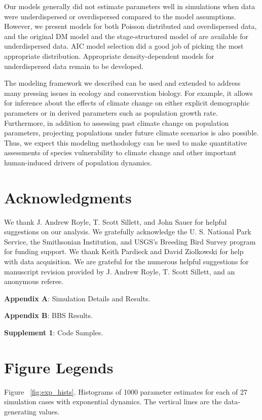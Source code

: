 \documentclass[12pt,english]{article}
\begin{document}
\begin{spacing}{1.9}
\begin{flushleft}
Our models generally did not estimate parameters well in simulations when data were underdispersed
or overdispersed compared to the model assumptions.  However, we present models for
both Poisson distributed and overdispersed data, and the original DM model and the 
stage-structured model of \citet{zipkin_etal:2014} are available for underdispersed data.  AIC model
selection did a good job of picking the most appropriate distribution.  Appropriate 
density-dependent models for underdispersed data remain to be developed.

The modeling framework we described can be used and extended to address many
pressing issues in ecology and conservation biology. For
example,
it allows for inference 
about the effects of climate change on either explicit
demographic parameters or in derived parameters such as
population growth rate. Furthermore, 
in addition to assessing past climate change on population
parameters, projecting populations under future climate scenarios is also
possible. Thus, we expect this modeling methodology can be used
to make quantitative assessments of species vulnerability to climate
change and other important human-induced drivers of population
dynamics.


\section*{Acknowledgments}

We thank J. Andrew Royle, T. Scott Sillett, and John Sauer for helpful suggestions on our analysis. 
We gratefully acknowledge the U. S. National Park 
Service, the Smithsonian Institution, and USGS's Breeding Bird Survey program for funding support.
We thank Keith Pardieck and David Ziolkowski for help with data acquisition. We are
grateful for the numerous helpful suggestions for manuscript
revision provided by J. Andrew Royle, T. Scott Sillett, and an anonymous
referee.



\begin{center}
\noindent{}\textbf{Appendix A}: Simulation Details and Results.

\noindent{}\textbf{Appendix B}: BBS Results.

\noindent{}\textbf{Supplement 1}: Code Samples.
\end{center}

\newpage


\clearpage

\section*{Figure Legends}
\noindent Figure ~\ref{fig:exp_hists}. Histograms of 1000 parameter estimates for each of 27
simulation cases with exponential dynamics. The vertical lines are the 
data-generating values.


\end{flushleft}
\end{spacing}
\end{document}
